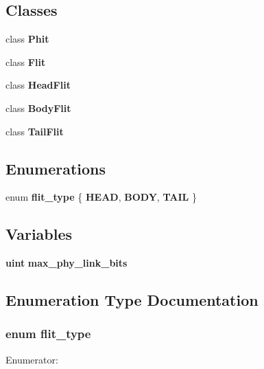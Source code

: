 \subsection*{Classes}
\begin{CompactItemize}
\item 
class {\bf Phit}
\item 
class {\bf Flit}
\item 
class {\bf HeadFlit}
\item 
class {\bf BodyFlit}
\item 
class {\bf TailFlit}
\end{CompactItemize}
\subsection*{Enumerations}
\begin{CompactItemize}
\item 
enum {\bf flit\_\-type} \{ {\bf HEAD}, 
{\bf BODY}, 
{\bf TAIL}
 \}
\end{CompactItemize}
\subsection*{Variables}
\begin{CompactItemize}
\item 
{\bf uint} {\bf max\_\-phy\_\-link\_\-bits}
\end{CompactItemize}


\subsection{Enumeration Type Documentation}
\subsubsection[{flit\_\-type}]{\setlength{\rightskip}{0pt plus 5cm}enum {\bf flit\_\-type}}\label{flit_8h_2c6c8cfc6307d086e578093535798328}


\begin{Desc}
\item[Enumerator: ]\par
\begin{description}
\item[{\em 
HEAD\label{flit_8h_2c6c8cfc6307d086e5780935357983280b0955668575b21eb0ab2272aef49f76}
}]\item[{\em 
BODY\label{flit_8h_2c6c8cfc6307d086e57809353579832840adb6a513bd35c0dfff0291e9fdaa63}
}]\item[{\em 
TAIL\label{flit_8h_2c6c8cfc6307d086e5780935357983284c28487b052a2b05f3db4dc5a722b1d7}
}]\end{description}
\end{Desc}



